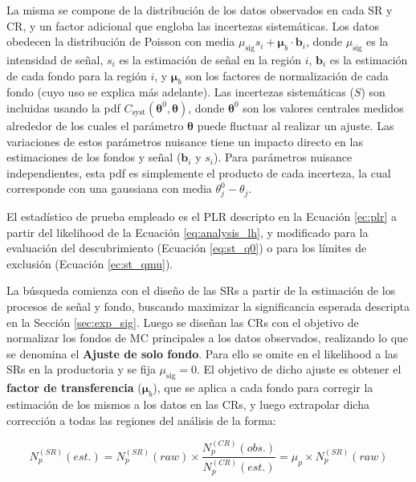La misma se compone de la distribución de los datos observados en cada SR y CR, y un factor adicional que engloba las incertezas sistemáticas. Los datos obedecen la distribución de Poisson con media $\mu_\text{sig} s_i + \bm{\mu}_b \cdot \textbf{b}_i$, donde $\mu_\text{sig}$ es la intensidad de señal, $s_i$ es la estimación de señal en la región $i$, $\textbf{b}_i$ es la estimación de cada fondo para la región $i$, y $\bm{\mu}_b$ son los factores de normalización de cada fondo (cuyo uso se explica más adelante). Las incertezas sistemáticas ($S$) son incluidas usando la pdf $C_\text{syst} (\bm{\theta}^0, \bm{\theta})$, donde $\bm{\theta}^0$ son los valores centrales medidos alrededor de los cuales el parámetro $\bm{\theta}$ puede fluctuar al realizar un ajuste. Las variaciones de estos parámetros nuisance tiene un impacto directo en las estimaciones de los fondos y señal ($\textbf{b}_i$ y $s_i$). Para parámetros nuisance independientes, esta pdf es simplemente el producto de cada incerteza, la cual corresponde con una gaussiana con media $\theta_j^0 - \theta_j$. 

El estadístico de prueba empleado es el PLR descripto en la Ecuación \ref{ec:plr} a partir del likelihood de la Ecuación \ref{eq:analysis_lh}, y modificado para la evaluación del descubrimiento (Ecuación \ref{eq:st_q0}) o para los límites de exclusión (Ecuación \ref{ec:st_qmu}).

La búsqueda comienza con el diseño de las SRs a partir de la estimación de los procesos de señal y fondo, buscando maximizar la significancia esperada descripta en la Sección \ref{sec:exp_sig}. Luego se diseñan las CRs con el objetivo de normalizar los fondos de MC principales a los datos observados, realizando lo que se denomina el \textbf{Ajuste de solo fondo}. Para ello se omite en el likelihood a las SRs en la productoria y se fija $\mu_\text{sig}=0$. El objetivo de dicho ajuste es obtener el \textbf{factor de transferencia} ($\bm{\mu}_b$), que se aplica a cada fondo para corregir la estimación de los mismos a los datos en las CRs, y luego extrapolar dicha corrección a todas las regiones del análisis de la forma:


\begin{equation}
    N^{(SR)}_{p}(est.) = N^{(SR)}_{p}(raw) \times \frac{N^{(CR)}_{p}(obs.)}{N^{(CR)}_{p}(est.)} = \mu_{p} \times N^{(SR)}_{p}(raw)
\end{equation}

